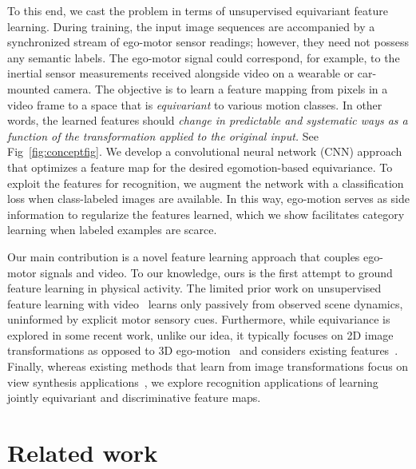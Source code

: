 \documentclass[10pt,twocolumn,letterpaper]{article}
\newcommand{\cc}{}
\begin{document}
To this end, we cast the problem in terms of unsupervised equivariant feature learning.  During training, the input image sequences are accompanied by a synchronized stream of ego-motor sensor readings; \cc{however, they need not possess any semantic labels.}  The ego-motor signal could correspond, for example, to the inertial sensor measurements received alongside video on a wearable or car-mounted camera.  The objective is to learn a feature mapping from pixels in a video frame to a space that is \emph{equivariant} to various motion classes.  In other words, the learned features should \emph{change in predictable and systematic ways as a function of the transformation applied to the original input.}  See Fig~\ref{fig:conceptfig}.  We develop a convolutional neural network (CNN) approach that optimizes a feature map for the desired egomotion-based equivariance.  To exploit the features for recognition, we augment the network with a classification loss when class-labeled images are available. In this way, ego-motion serves as side information to regularize the features learned, which we show facilitates category learning when labeled examples are scarce.


Our main contribution is a novel feature learning approach that couples ego-motor signals and video.  To our knowledge, ours is the first attempt to ground feature learning in physical activity.
The limited prior work on unsupervised feature learning with video~\cite{Mobahi2009,Ranzato2014, Michalski2014,Goroshin2014} learns only passively from observed scene dynamics, uninformed by explicit motor sensory cues.  Furthermore, while equivariance is explored in some recent work, unlike our idea, it typically focuses on 2D image transformations as opposed to 3D ego-motion~\cite{kivinen2011transformation,schmidt2012learning} and considers existing features~\cite{tinne-survey,Vedaldi2014}.  Finally, whereas existing methods that learn from image transformations focus on view synthesis applications~\cite{Hinton2011,kulkarni2015deep,Michalski2014}, we explore recognition applications of learning jointly equivariant and discriminative feature maps.


\vspace{-0.05in}\section{Related work}\label{sec:related}%
\end{document}
